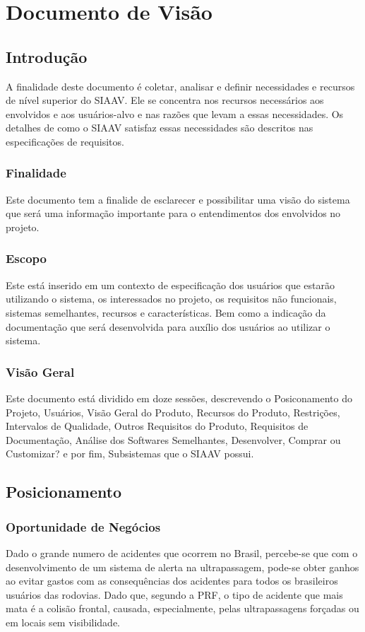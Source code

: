 \chapter[Documento de Visão]{Documento de Visão}

\section{Introdução}
A finalidade deste documento é coletar, analisar e definir necessidades e recursos de nível superior do SIAAV. Ele se concentra nos recursos necessários aos envolvidos e aos usuários-alvo e nas razões que levam a essas necessidades. Os detalhes de como o SIAAV satisfaz essas necessidades são descritos nas especificações de requisitos.

\subsection{Finalidade}
Este documento tem a finalide de  esclarecer e possibilitar uma visão do sistema que será uma informação importante para o entendimentos dos envolvidos no projeto.
\subsection{Escopo}
Este está inserido em um contexto de especificação dos usuários que estarão utilizando o sistema, os interessados no projeto, os requisitos não funcionais, sistemas semelhantes, recursos e características. Bem como a indicação da documentação que será desenvolvida para auxílio dos usuários ao utilizar o sistema.
\subsection{Visão Geral}
Este documento está dividido em doze sessões, descrevendo o Posiconamento do Projeto, Usuários, Visão Geral do Produto, Recursos do Produto, Restrições, Intervalos de Qualidade, Outros Requisitos do Produto, Requisitos de Documentação, Análise dos Softwares Semelhantes, Desenvolver, Comprar ou Customizar? e por fim, Subsistemas que o SIAAV possui.

\section{Posicionamento}

\subsection{Oportunidade de Negócios}
Dado o grande numero de acidentes que ocorrem no Brasil, percebe-se que com o
desenvolvimento de um sistema de alerta na ultrapassagem, pode-se obter
ganhos ao evitar gastos com as consequências dos acidentes para todos os
brasileiros usuários das rodovias. Dado que, segundo a PRF, o tipo de acidente
que mais mata é a colisão frontal, causada, especialmente, pelas ultrapassagens
forçadas ou em locais sem visibilidade\cite{prf}.

